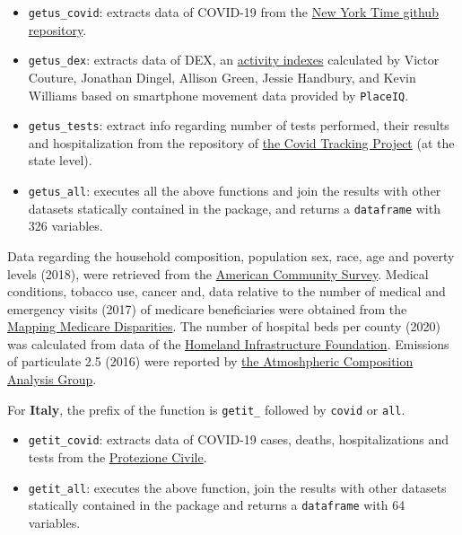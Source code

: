 \documentclass[12pt,halfline,a4paper,]{ouparticle}
\providecommand{\tightlist}{%
  \setlength{\itemsep}{0pt}\setlength{\parskip}{0pt}}
\begin{document}
\begin{itemize}
\tightlist
\item
  \texttt{getus\_covid}: extracts data of COVID-19 from the
  \href{https://github.com/nytimes/covid-19-data}{New York Time github
  repository}.
\item
  \texttt{getus\_dex}: extracts data of DEX, an
  \href{https://github.com/COVIDExposureIndices/COVIDExposureIndices}{activity
  indexes} calculated by Victor Couture, Jonathan Dingel, Allison Green,
  Jessie Handbury, and Kevin Williams based on smartphone movement data
  provided by \texttt{PlaceIQ}.
\item
  \texttt{getus\_tests}: extract info regarding number of tests
  performed, their results and hospitalization from the repository of
  \href{https://covidtracking.com/api\%7D}{the Covid Tracking Project}
  (at the state level).
\item
  \texttt{getus\_all}: executes all the above functions and join the
  results with other datasets statically contained in the package, and
  returns a \texttt{dataframe} with 326 variables.
\end{itemize}

Data regarding the household composition, population sex, race, age and
poverty levels (2018), were retrieved from the
\href{https://data.census.gov/cedsci/table?q=United\%20States}{American
Community Survey}. Medical conditions, tobacco use, cancer and, data
relative to the number of medical and emergency visits (2017) of
medicare beneficiaries were obtained from the
\href{https://data.cms.gov/mapping-medicare-disparities}{Mapping
Medicare Disparities}. The number of hospital beds per county (2020) was
calculated from data of the
\href{https://hifld-geoplatform.opendata.arcgis.com/datasets/hospitals/data?page=18}{Homeland
Infrastructure Foundation}. Emissions of particulate 2.5 (2016) were
reported by
\href{http://fizz.phys.dal.ca/~atmos/martin/?page_id=140\#V4.NA.02.MAPLE}{the
Atmoshpheric Composition Analysis Group}.

For \textbf{Italy}, the prefix of the function is \texttt{getit\_}
followed by \texttt{covid} or \texttt{all}.

\begin{itemize}
\tightlist
\item
  \texttt{getit\_covid}: extracts data of COVID-19 cases, deaths,
  hospitalizations and tests from the
  \href{\%22https://raw.githubusercontent.com/pcm-dpc/COVID-19/master/dati-regioni/dpc-covid19-ita-regioni.csv\%22}{Protezione
  Civile}.
\item
  \texttt{getit\_all}: executes the above function, join the results
  with other datasets statically contained in the package and returns a
  \texttt{dataframe} with 64 variables.
\end{itemize}
\end{document}
